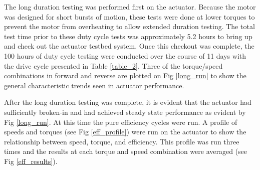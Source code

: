 
The long duration testing was performed first on the actuator.
Because the motor was designed for short bursts of motion, these tests were done at lower torques to prevent the motor from overheating to allow extended duration testing.
The total test time prior to these duty cycle tests was approximately 5.2 hours to bring up and check out the actuator testbed system.
Once this checkout was complete, the 100 hours of duty cycle testing were conducted over the course of 11 days with the drive cycle presented in Table \ref{table_2}.
Three of the torque/speed combinations in forward and reverse are plotted on Fig \ref{long_run} to show the general characteristic trends seen in actuator performance.

After the long duration testing was complete, it is evident that the actuator had sufficiently broken-in and had achieved steady state performance as evident by Fig \ref{long_run}. At this time the pure efficiency cycles were run.
A profile of speeds and torques (see Fig \ref{eff_profile}) were run on the actuator to show the relationship between speed, torque, and efficiency.
This profile was run three times and the results at each torque and speed combination were averaged (see Fig \ref{eff_results}).

